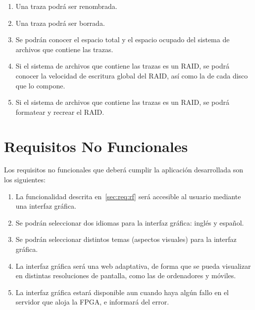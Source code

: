 \begin{enumerate}[align=left,before=\itshape,font=\normalfont,label=\bfseries RF. \arabic*]
  \item Una \gls{traza} podrá ser renombrada.
  \item Una \gls{traza} podrá ser borrada.
  \item Se podrán conocer el espacio total y el espacio ocupado del sistema de archivos que contiene las \glspl{traza}.
  \item Si el sistema de archivos que contiene las \glspl{traza} es un \gls{RAID}, se podrá conocer la velocidad de escritura global del \gls{RAID}, así como la de cada disco que lo compone.
  \item Si el sistema de archivos que contiene las \glspl{traza} es un \gls{RAID}, se podrá formatear y recrear el \gls{RAID}.
\end{enumerate}


\section{Requisitos No Funcionales\label{sec:req:rnf}}

Los requisitos no funcionales que deberá cumplir la aplicación desarrollada son los siguientes:

\begin{enumerate}[align=left,before=\itshape,font=\normalfont,label=\bfseries RNF. \arabic*]
  \item La funcionalidad descrita en~\ref{sec:req:rf} será accesible al usuario mediante una interfaz gráfica.
  \item Se podrán seleccionar dos idiomas para la interfaz gráfica: inglés y español.
  \item Se podrán seleccionar distintos temas (aspectos visuales) para la interfaz gráfica.
  \item La interfaz gráfica será una web adaptativa, de forma que se pueda visualizar en distintas resoluciones de pantalla, como las de ordenadores y móviles.
  \item La interfaz gráfica estará disponible aun cuando haya algún fallo en el servidor que aloja la \gls{FPGA}, e informará del error.
\end{enumerate}